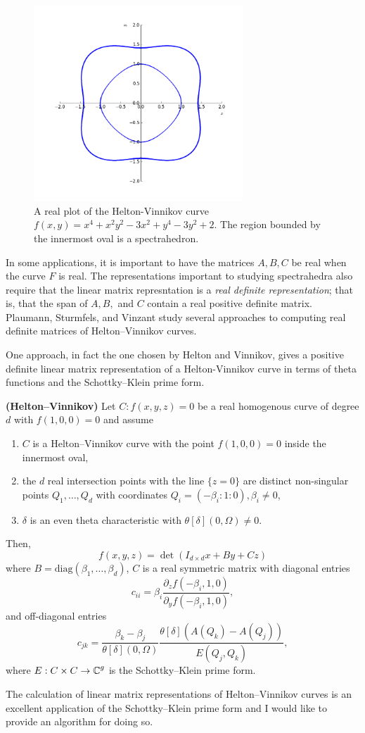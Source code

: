 \begin{figure}[t]
  \centering
  \includegraphics[width=0.7\textwidth]{images/helton-vinnikov.png}
  \caption{A real plot of the Helton-Vinnikov curve $f(x,y) = x^{4} +
    x^{2} y^{2} - 3 x^{2} + y^{4} - 3 y^{2} + 2$. The region bounded by
    the innermost oval is a spectrahedron.}
  \label{fig: spectrahedron}
\end{figure}

In some applications, it is important to have the matrices $A,B,C$ be
real when the curve $F$ is real. The representations important to
studying spectrahedra also require that the linear matrix represntation
is a {\it real definite representation}; that is, that the span of
$A,B,$ and $C$ contain a real positive definite matrix. Plaumann,
Sturmfels, and Vinzant \cite{PSV10} study several approaches to
computing real definite matrices of Helton--Vinnikov curves.

One approach, in fact the one chosen by Helton and Vinnikov, gives a
positive definite linear matrix representation of a Helton-Vinnikov
curve in terms of theta functions and the Schottky--Klein prime form.

\begin{theorem}
{\bf (Helton--Vinnikov)} Let $C : f(x,y,z) = 0$ be a real homogenous
curve of degree $d$ with $f(1,0,0) = 0$ and assume
\begin{enumerate}
  \item $C$ is a Helton--Vinnikov curve with the point $f(1,0,0) = 0$
    inside the innermost oval,
  \item the $d$ real intersection points with the line $\{z = 0\}$ are
    distinct non-singular points $Q_1,\ldots,Q_d$ with coordinates $Q_i
    = (-\beta_i : 1 : 0), \beta_i \neq 0$,
  \item $\delta$ is an even theta characteristic with
    $\theta[\delta](0,\Omega) \neq 0$.
\end{enumerate}
Then,
\[
    f(x,y,z) = \det \left( I_{d \times d}x + By + Cz \right)
\]
where $B = \text{diag}(\beta_1,\ldots,\beta_d)$, $C$ is a real
symmetric matrix with diagonal entries
\[
    c_{ii} = \beta_i
    \frac{\partial_z f(-\beta_i,1,0)}{\partial_y f(-\beta_i,1,0)},
\]
and off-diagonal entries
\[
    c_{jk} = \frac{\beta_k - \beta_j}{\theta[\delta](0,\Omega)}
    \frac{\theta[\delta](A(Q_k) - A(Q_j))}{E(Q_j,Q_k)},
\]
where $E : C \times C \to \operatorname{\mathbb{C}}^g$ is the Schottky--Klein prime form.
\end{theorem}

The calculation of linear matrix representations of Helton--Vinnikov
curves is an excellent application of the Schottky--Klein prime form and
I would like to provide an algorithm for doing so.

